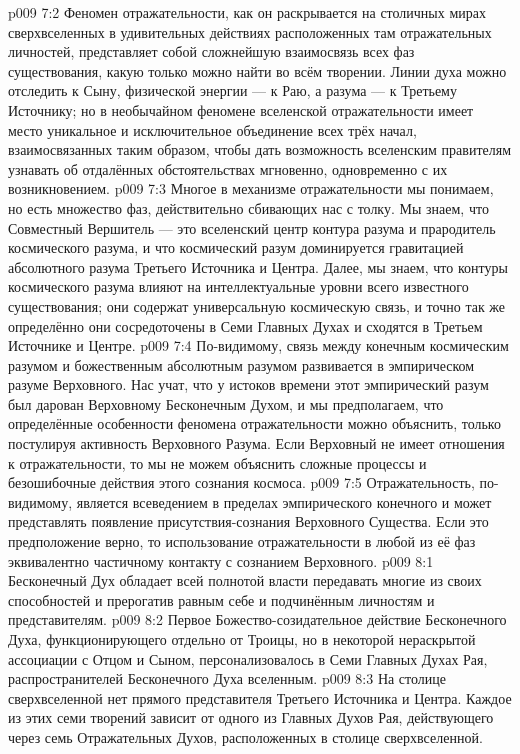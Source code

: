 \vs p009 7:2 Феномен отражательности, как он раскрывается на столичных мирах сверхвселенных в удивительных действиях расположенных там отражательных личностей, представляет собой сложнейшую взаимосвязь всех фаз существования, какую только можно найти во всём творении. Линии духа можно отследить к Сыну, физической энергии --- к Раю, а разума --- к Третьему Источнику; но в необычайном феномене вселенской отражательности имеет место уникальное и исключительное объединение всех трёх начал, взаимосвязанных таким образом, чтобы дать возможность вселенским правителям узнавать об отдалённых обстоятельствах мгновенно, одновременно с их возникновением.
\vs p009 7:3 Многое в механизме отражательности мы понимаем, но есть множество фаз, действительно сбивающих нас с толку. Мы знаем, что Совместный Вершитель --- это вселенский центр контура разума и прародитель космического разума, и что космический разум доминируется гравитацией абсолютного разума Третьего Источника и Центра. Далее, мы знаем, что контуры космического разума влияют на интеллектуальные уровни всего известного существования; они содержат универсальную космическую связь, и точно так же определённо они сосредоточены в Семи Главных Духах и сходятся в Третьем Источнике и Центре.
\vs p009 7:4 \pc По\hyp{}видимому, связь между конечным космическим разумом и божественным абсолютным разумом развивается в эмпирическом разуме Верховного. Нас учат, что у истоков времени этот эмпирический разум был дарован Верховному Бесконечным Духом, и мы предполагаем, что определённые особенности феномена отражательности можно объяснить, только постулируя активность Верховного Разума. Если Верховный не имеет отношения к отражательности, то мы не можем объяснить сложные процессы и безошибочные действия этого сознания космоса.
\vs p009 7:5 Отражательность, по\hyp{}видимому, является всеведением в пределах эмпирического конечного и может представлять появление присутствия\hyp{}сознания Верховного Существа. Если это предположение верно, то использование отражательности в любой из её фаз эквивалентно частичному контакту с сознанием Верховного.
\vs p009 8:1 Бесконечный Дух обладает всей полнотой власти передавать многие из своих способностей и прерогатив равным себе и подчинённым личностям и представителям.
\vs p009 8:2 Первое Божество\hyp{}созидательное действие Бесконечного Духа, функционирующего отдельно от Троицы, но в некоторой нераскрытой ассоциации с Отцом и Сыном, персонализовалось в Семи Главных Духах Рая, распространителей Бесконечного Духа вселенным.
\vs p009 8:3 На столице сверхвселенной нет прямого представителя Третьего Источника и Центра. Каждое из этих семи творений зависит от одного из Главных Духов Рая, действующего через семь Отражательных Духов, расположенных в столице сверхвселенной.
